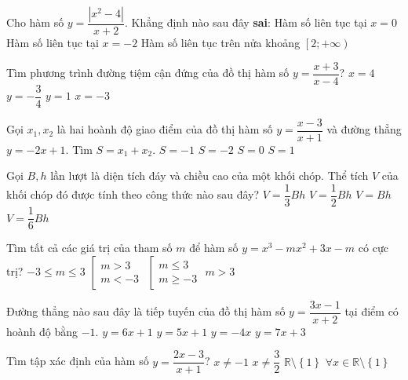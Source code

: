 \begin{ex}%
Cho hàm số $y = \dfrac{\left| x^2 - 4 \right|}{x + 2}$. Khẳng định nào sau đây \textbf{sai}:
{Hàm số liên tục tại $x=0$}
{\True Hàm số liên tục tại $x=-2$}
{Hàm số liên tục trên nửa khoảng $\left[2;+\infty \right)$}
\end{ex}
\begin{ex}%
Tìm phương trình đường tiệm cận đứng của đồ thị hàm số $y=\dfrac{x+3}{x-4}$?
\choice
{\True $x=4$}
{$y=-\dfrac{3}{4}$}
{$y=1$}
{$x=-3$}
\end{ex}
\begin{ex}%
Gọi $x_1,x_2$ là hai hoành độ giao điểm của đồ thị hàm số $y=\dfrac{x-3}{x+1}$ và đường thẳng $y=-2x+1$. Tìm $S=x_1+x_2$.
\choice
{\True $S=-1$}
{$S=-2$}
{$S=0$}
{$S=1$}
\end{ex}
\begin{ex}%
Gọi $B,h$ lần lượt là diện tích đáy và chiều cao của một khối chóp. Thể tích $V$ của khối chóp đó được tính theo công thức nào sau đây?
\choice
{\True$V=\dfrac{1}{3}Bh$}
{$V=\dfrac{1}{2}Bh$}
{$V=Bh$}
{$V=\dfrac{1}{6}Bh$}
\end{ex}
\begin{ex}%
Tìm tất cả các giá trị của tham số $m$ để hàm số $y=x^3-mx^2+3x-m$ có cực trị?
\choice
{$-3\le m \le 3$}
{\True $\left[ \begin{array}{l}
m > 3\\
m <  - 3
\end{array} \right.$}
{$\left[ \begin{array}{l}
m \le 3\\
m \ge  - 3
\end{array} \right.$}
{$m>3$}
\end{ex}
\begin{ex}%
Đường thẳng nào sau đây là tiếp tuyến của đồ thị hàm số $y=\dfrac{3x-1}{x+2}$ tại điểm có hoành độ bằng $-1$.
\choice
{$y=6x+1$}
{$y=5x+1$}
{$y=-4x$}
{\True $y=7x+3$}
\end{ex}
\begin{ex}%
Tìm tập xác định của hàm số $y=\dfrac{2x-3}{x+1}$?
\choice
{$x\neq-1$}
{$x\neq \dfrac{3}{2}$}
{$\mathbb{R}\setminus \left\{ 1 \right\}$}
{$\forall x \in \mathbb{R}\setminus \left\{ 1 \right\}$}
\end{ex}
